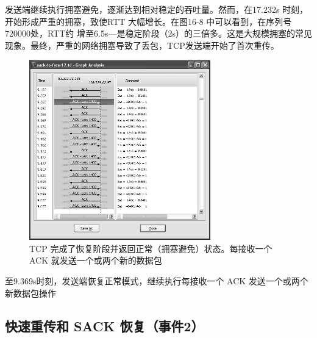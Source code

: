 发送端继续执行拥塞避免，逐渐达到相对稳定的吞吐量。然而，在17.232s 时刻，开始形成严重的拥塞，致使RTT 大幅增长。在图16-8 中可以看到，在序列号 720000处，RTT约
增至6.5s—是稳定阶段（2s）的三倍多。这是大规模拥塞的常见现象。最终，严重的网络拥塞导致了丢包，TCP发送端开始了首次重传。
\begin{figure}[!htb]
    \centering
	\includegraphics[width=0.7\textwidth]{imgs/16/16-11.png}
	\caption{TCP 完成了恢复阶段并返回正常（拥塞避免）状态。每接收一个 ACK 就发送一个或两个新的数据包}
\end{figure}
至9.369s时刻，发送端恢复正常模式，继续执行每接收一个 ACK 发送一个或两个新数据包操作

\subsection{快速重传和 SACK 恢复（事件2）}


